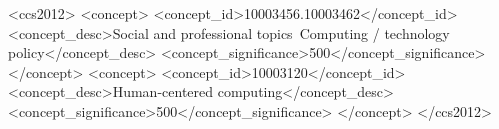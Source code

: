 \documentclass[sigconf]{acmart}
\begin{document}
\begin{CCSXML}
<ccs2012>
<concept>
<concept_id>10003456.10003462</concept_id>
<concept_desc>Social and professional topics~Computing / technology policy</concept_desc>
<concept_significance>500</concept_significance>
</concept>
<concept>
<concept_id>10003120</concept_id>
<concept_desc>Human-centered computing</concept_desc>
<concept_significance>500</concept_significance>
</concept>
</ccs2012>
\end{CCSXML}





\maketitle
\end{document}
